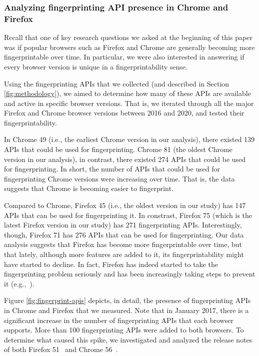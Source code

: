 \subsubsection{Analyzing fingerprinting API presence in Chrome and
  Firefox}

Recall that one of key research questions we asked at the beginning of
this paper was if popular browsers such as Firefox and Chrome are
generally becoming more fingerprintable over time. In particular, we
were also interested in answering if every browser version is unique
in a fingerprintability sense.

Using the fingerprinting APIs that we collected (and described in
Section \ref{fig:methodology}), we aimed to determine how many of
these APIs are available and active in specific browser versions. That
is, we iterated through all the major Firefox and Chrome browser
versions between 2016 and 2020, and tested their fingerprintability.

In Chrome 49 (i.e., the earliest Chrome version in our analysis),
there existed 139 APIs that could be used for fingerprinting. Chrome
81 (the oldest Chrome version in our analysis), in contrast, there
existed 274 APIs that could be used for fingerprinting. In short, the
number of APIs that could be used for fingerprinting Chrome versions
were increasing over time. That is, the data suggests that Chrome is
becoming easier to fingerprint.

Compared to Chrome, Firefox 45 (i.e., the oldest version in our study)
has 147 APIs that can be used for fingerprinting it. In constrast,
Firefox 75 (which is the latest Firefox version in our study) has 271
fingerprinting APIs. Interestingly, though, Firefox 71 has 276 APIs
that can be used for fingerprinting. Our data analysis suggests that
Firefox has become more fingerprintable over time, but that lately,
although more features are added to it, its fingerprintability might
have started to decline. In fact, Firefox has indeed started to take
the fingerprinting problem seriously and has been increasingly taking
steps to prevent it (e.g.,~\cite{FirefoxFingerprinting}).

Figure \ref{fig:fingerprint-apis} depicts, in detail, the presence of
fingerprinting APIs in Chrome and Firefox that we measured. Note that
in January 2017, there is a significant increase in the number of
fingerprinting APIs that each browser supports. More than 100
fingerprinting APIs were added to both browsers. To determine what
caused this spike, we investigated and analyzed the release notes of
both Firefox 51~\cite{firefox-51-notes} and Chrome
56~\cite{chrome-56-notes}.

